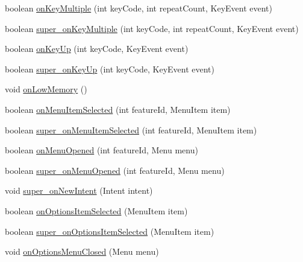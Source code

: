 \begin{DoxyCompactItemize}
\item 
boolean \hyperlink{classorg_1_1kde_1_1necessitas_1_1origo_1_1_qt_activity_a87624f6e5e257cb4ddfdfd9ed73cd884}{on\-Key\-Multiple} (int key\-Code, int repeat\-Count, Key\-Event event)
\item 
boolean \hyperlink{classorg_1_1kde_1_1necessitas_1_1origo_1_1_qt_activity_a8c3dc079ce0d5a260d16e704f2ad8504}{super\-\_\-on\-Key\-Multiple} (int key\-Code, int repeat\-Count, Key\-Event event)
\item 
boolean \hyperlink{classorg_1_1kde_1_1necessitas_1_1origo_1_1_qt_activity_a7dde4596c4412654c9c706cb0407f67b}{on\-Key\-Up} (int key\-Code, Key\-Event event)
\item 
boolean \hyperlink{classorg_1_1kde_1_1necessitas_1_1origo_1_1_qt_activity_ac15d17c2dcb9a8c77540d45c91c76908}{super\-\_\-on\-Key\-Up} (int key\-Code, Key\-Event event)
\item 
void \hyperlink{classorg_1_1kde_1_1necessitas_1_1origo_1_1_qt_activity_a99741e578bdfcc2faaa38cd4671c4454}{on\-Low\-Memory} ()
\item 
boolean \hyperlink{classorg_1_1kde_1_1necessitas_1_1origo_1_1_qt_activity_a47b8617cac3c92fe6d251e1e3884ac09}{on\-Menu\-Item\-Selected} (int feature\-Id, Menu\-Item item)
\item 
boolean \hyperlink{classorg_1_1kde_1_1necessitas_1_1origo_1_1_qt_activity_a2fe3e2d563daec3ba16f0c09d82ae8bf}{super\-\_\-on\-Menu\-Item\-Selected} (int feature\-Id, Menu\-Item item)
\item 
boolean \hyperlink{classorg_1_1kde_1_1necessitas_1_1origo_1_1_qt_activity_ade5cf3b2cd0f80c6b778447836b5186c}{on\-Menu\-Opened} (int feature\-Id, Menu menu)
\item 
boolean \hyperlink{classorg_1_1kde_1_1necessitas_1_1origo_1_1_qt_activity_abaa0e8a8abce8b59df3547a7e122c5ac}{super\-\_\-on\-Menu\-Opened} (int feature\-Id, Menu menu)
\item 
void \hyperlink{classorg_1_1kde_1_1necessitas_1_1origo_1_1_qt_activity_a3e1a06b35a139d169082fe3207463183}{super\-\_\-on\-New\-Intent} (Intent intent)
\item 
boolean \hyperlink{classorg_1_1kde_1_1necessitas_1_1origo_1_1_qt_activity_af694bbc80efa8a408cf2efb54c7161bd}{on\-Options\-Item\-Selected} (Menu\-Item item)
\item 
boolean \hyperlink{classorg_1_1kde_1_1necessitas_1_1origo_1_1_qt_activity_a63c4160b9446058bdd5bc70a446ebf18}{super\-\_\-on\-Options\-Item\-Selected} (Menu\-Item item)
\item 
void \hyperlink{classorg_1_1kde_1_1necessitas_1_1origo_1_1_qt_activity_a968f7dbe7ba9affe78a4831e26cd97c6}{on\-Options\-Menu\-Closed} (Menu menu)

\end{DoxyCompactItemize}
